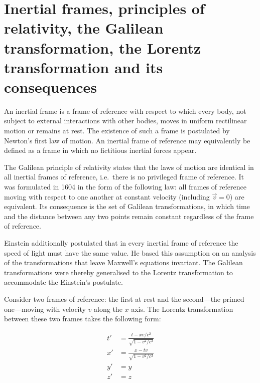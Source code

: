 
\section{Inertial frames, principles of relativity, the Galilean transformation, the Lorentz transformation and its consequences}

An inertial frame is a frame of reference with respect to which every body, not subject to external interactions with other bodies, moves in uniform rectilinear motion or remains at rest. The existence of such a frame is postulated by Newton's first law of motion. An inertial frame of reference may equivalently be defined as a frame in which no fictitious inertial forces appear.

The Galilean principle of relativity states that the laws of motion are identical in all inertial frames of reference, i.e.\ there is no privileged frame of reference. It was formulated in 1604 in the form of the following law: all frames of reference moving with respect to one another at constant velocity (including $\vec{v}=0$) are equivalent. Its consequence is the set of Galilean transformations, in which time and the distance between any two points remain constant regardless of the frame of reference.

Einstein additionally postulated that in every inertial frame of reference the speed of light must have the same value. He based this assumption on an analysis of the transformations that leave Maxwell's equations invariant. The Galilean transformations were thereby generalised to the Lorentz transformation to accommodate the Einstein's postulate.

Consider two frames of reference: the first at rest and the second---the primed one---moving with velocity $v$ along the $x$ axis. The Lorentz transformation between these two frames takes the following form:

\begin{align*}
    t' &= \frac{t-xv/c^2}{\sqrt{1-v^2/c^2}} \\
    x' &= \frac{x-tv}{\sqrt{1-v^2/c^2}} \\
    y' &= y \\
    z' &= z
\end{align*}

